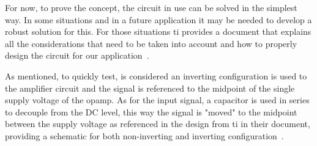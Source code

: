 For now, to prove the concept, the circuit in use can be solved in the simplest way. In some situations and in a future application it may be needed to develop a robust solution for this. For those situations \acrshort{ti} provides a document that explains all the considerations that need to be taken into account and how to properly design the circuit for our application~\cite{manciniSingleSupplyOpAmp}.

As mentioned, to quickly test, is considered an inverting configuration is used to the amplifier circuit and the signal is referenced to the midpoint of the single supply voltage of the \acrshort{opamp}. As for the input signal, a capacitor is used in series to decouple from the DC level, this way the signal is "moved" to the midpoint between the supply voltage as referenced in the design from \acrshort{ti} in their document, providing a schematic for both non-inverting and inverting configuration~\cite{ACCoupledSingle2015}.

